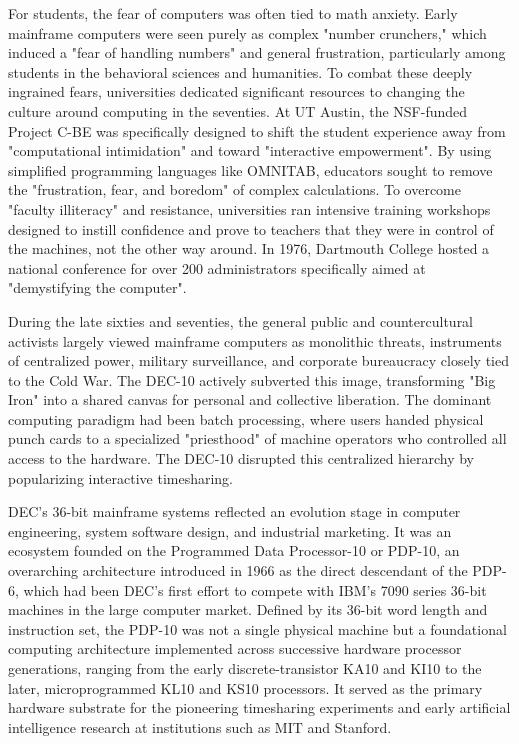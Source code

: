 For students, the fear of computers was often tied to math anxiety. Early mainframe computers were seen purely as complex "number crunchers," which induced a "fear of handling numbers" and general frustration, particularly among students in the behavioral sciences and humanities. To combat these deeply ingrained fears, universities dedicated significant resources to changing the culture around computing in the seventies. At UT Austin, the NSF-funded Project C-BE was specifically designed to shift the student experience away from "computational intimidation" and toward "interactive empowerment". By using simplified programming languages like OMNITAB, educators sought to remove the "frustration, fear, and boredom" of complex calculations. To overcome "faculty illiteracy" and resistance, universities ran intensive training workshops designed to instill confidence and prove to teachers that they were in control of the machines, not the other way around. In 1976, Dartmouth College hosted a national conference for over 200 administrators specifically aimed at "demystifying the computer".

During the late sixties and seventies, the general public and countercultural activists largely viewed mainframe computers as monolithic threats, instruments of centralized power, military surveillance, and corporate bureaucracy closely tied to the Cold War. The DEC-10 actively subverted this image, transforming "Big Iron" into a shared canvas for personal and collective liberation. The dominant computing paradigm had been batch processing, where users handed physical punch cards to a specialized "priesthood" of machine operators who controlled all access to the hardware. The DEC-10 disrupted this centralized hierarchy by popularizing interactive timesharing. 

DEC’s 36-bit mainframe systems reflected an evolution stage in computer engineering, system software design, and industrial marketing. It was an ecosystem founded on the Programmed Data Processor-10 or PDP-10, an overarching architecture introduced in 1966 as the direct descendant of the PDP-6, which had been DEC’s first effort to compete with IBM’s 7090 series 36-bit machines in the large computer market. Defined by its 36-bit word length and instruction set, the PDP-10 was not a single physical machine but a foundational computing architecture implemented across successive hardware processor generations, ranging from the early discrete-transistor KA10 and KI10 to the later, microprogrammed KL10 and KS10 processors. It served as the primary hardware substrate for the pioneering timesharing experiments and early artificial intelligence research at institutions such as MIT and Stanford.

